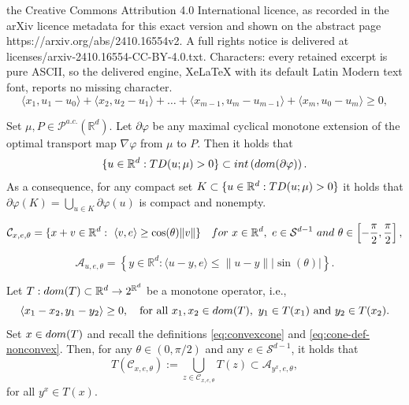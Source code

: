 \documentclass[10pt,a4paper]{amsart}
\newcommand{\R}{\mathbb{R}}
\begin{document}
the Creative Commons Attribution 4.0 International licence, as recorded in the arXiv licence metadata for this exact version and shown on the abstract page https://arxiv.org/abs/2410.16554v2. A full rights notice is delivered at licenses/arxiv-2410.16554-CC-BY-4.0.txt. Characters: every retained excerpt is pure ASCII, so the delivered engine, XeLaTeX with its default Latin Modern text font, reports no missing character.
\begin{equation}
    \label{MonotoneQuant}
    \langle x_1 , u_1 - u_0 \rangle +\langle x_2 , u_2- u_1 \rangle +\dots+\langle x_{m-1}, u_m - u_{m-1} \rangle+ \langle x_m, u_0 - u_m \rangle \geq 0 ,
\end{equation}

\begin{lemma}
\label{Lemma:TukeyPositiveCont} 
    Set $\mu,P\in \mathcal{P}^{a.c.}(\R^d)$. Let $\partial \varphi$ be any maximal {  cyclical} monotone extension of  the optimal transport map $\nabla \varphi$ from $\mu$ to $P$.  Then it holds that 
    \begin{equation}
        \label{eq:TukeyPositiveCont}
        \{u\in \R^d: 
    {\rm TD}(u;\mu)>0\}\subset {\rm int}\left({\rm dom}(\partial \varphi)\right).
    \end{equation}
    As a consequence, for any compact set $K\subset \{u\in \R^d: 
    {\rm TD}(u;\mu)>0\}$ it holds that 
    $\partial \varphi(K)=\bigcup_{u\in K} \partial \varphi(u)$ is  compact and nonempty.
\end{lemma}

\begin{equation}
    \label{eq:convexcone}
    \mathcal{C}_{x,e, \theta} =\{ x+v\in \R^d: \ \langle v, e\rangle \geq \cos(\theta) \|v\|\} \quad  {{\rm for}\  x\in \R^d, \ e\in \mathcal{S}^{d-1}\ {\rm and}\  \theta\in \left[-\frac{\pi}{2}, \frac{\pi}{2}\right],} 
\end{equation}

\begin{equation}
    \label{eq:cone-def-nonconvex}
    \mathcal{A}_{u,e, \theta} =\left\{y\in \R^d: \langle u-y, e\rangle\leq 
 \| u-y\|  {|\sin(\theta)|}   \right\}. 
\end{equation}

\begin{lemma}\label{lemma:conetocone}
     Let $T:{\rm dom}(T)\subset \R^d\to 2^{\R^d}$ be a monotone operator, i.e., 
     \begin{equation}
         \label{monoton}
         \langle x_1-x_2, y_1-y_2\rangle\geq 0, \quad \text{for all } x_1,x_2\in {\rm dom}(T),\ y_1\in T(x_1) \ \text{and}\  y_2\in T(x_2) .
     \end{equation}
    Set $ x\in  {\rm dom}(T) $ and  {recall the definitions \eqref{eq:convexcone} and \eqref{eq:cone-def-nonconvex}.} Then, for any  $\theta\in (0, \pi/2)$ and any $e\in \mathcal{S}^{d-1}$, it holds that $$T(\mathcal{C}_{x,e, \theta}):=\bigcup_{z\in\mathcal{C}_{x,e, \theta} } T(z)\subset \mathcal{A}_{y^x,e, \theta},$$
    for all $y^x\in T(x)$. 
 \end{lemma}
\end{document}
